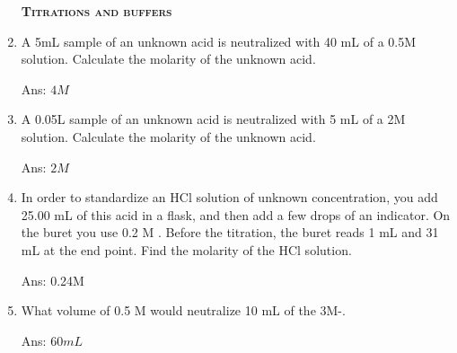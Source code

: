 \documentclass[main.tex]{subfiles}
\begin{document}
\begin{multicols*}{2}
\begin{enumerate}
{\raggedright\textsc{\textbf{Titrations and buffers}}\par}
\item A 5mL sample of an unknown acid is neutralized with 40 mL of a  0.5M solution. Calculate the molarity of the unknown acid.
\begin{flushright}\small Ans: $4M$ \end{flushright}
\item A 0.05L sample of an unknown acid is neutralized with 5 mL of a  2M solution. Calculate the molarity of the unknown acid.
\begin{flushright}\small Ans: $2M$ \end{flushright}
\item In order to standardize an HCl solution of unknown concentration, you add 25.00 mL of this acid in a  flask, and then add a few drops of an indicator. On the buret you use 0.2 M . Before the titration, the buret reads 1 mL and 31 mL at the end point. Find the molarity of the HCl solution.
\begin{flushright}\small Ans: 0.24M \end{flushright}
\item What volume of 0.5 M  would neutralize 10 mL of the 3M-. 
\begin{flushright}\small Ans: $60mL$ \end{flushright}









\restoregeometry
\end{enumerate}
\end{multicols*}
\pagecolor{green!10}\afterpage{\nopagecolor}\newpage
\end{document}
